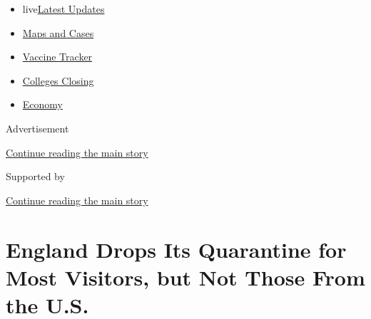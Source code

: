 \begin{itemize}
\tightlist
\item
  live\href{https://www.nytimes3xbfgragh.onion/2020/08/21/world/covid-19-coronavirus.html?name=styln-coronavirus-national\&region=TOP_BANNER\&variant=undefined\&block=storyline_menu_recirc\&action=click\&pgtype=Article\&impression_id=98d1fe81-e396-11ea-8ad8-e9df2f9ec099}{Latest
  Updates}
\item
  \href{https://www.nytimes3xbfgragh.onion/interactive/2020/us/coronavirus-us-cases.html?name=styln-coronavirus-national\&region=TOP_BANNER\&variant=undefined\&block=storyline_menu_recirc\&action=click\&pgtype=Article\&impression_id=98d1fe82-e396-11ea-8ad8-e9df2f9ec099}{Maps
  and Cases}
\item
  \href{https://www.nytimes3xbfgragh.onion/interactive/2020/science/coronavirus-vaccine-tracker.html?name=styln-coronavirus-national\&region=TOP_BANNER\&variant=undefined\&block=storyline_menu_recirc\&action=click\&pgtype=Article\&impression_id=98d22590-e396-11ea-8ad8-e9df2f9ec099}{Vaccine
  Tracker}
\item
  \href{https://www.nytimes3xbfgragh.onion/2020/08/19/us/colleges-closing-covid.html?name=styln-coronavirus-national\&region=TOP_BANNER\&variant=undefined\&block=storyline_menu_recirc\&action=click\&pgtype=Article\&impression_id=98d22591-e396-11ea-8ad8-e9df2f9ec099}{Colleges
  Closing}
\item
  \href{https://www.nytimes3xbfgragh.onion/live/2020/08/20/business/stock-market-today-coronavirus?name=styln-coronavirus-national\&region=TOP_BANNER\&variant=undefined\&block=storyline_menu_recirc\&action=click\&pgtype=Article\&impression_id=98d22592-e396-11ea-8ad8-e9df2f9ec099}{Economy}
\end{itemize}

Advertisement

\protect\hyperlink{after-top}{Continue reading the main story}

Supported by

\protect\hyperlink{after-sponsor}{Continue reading the main story}

\hypertarget{england-drops-its-quarantine-for-most-visitors-but-not-those-from-the-us}{%
\section{England Drops Its Quarantine for Most Visitors, but Not Those
From the
U.S.}\label{england-drops-its-quarantine-for-most-visitors-but-not-those-from-the-us}}

